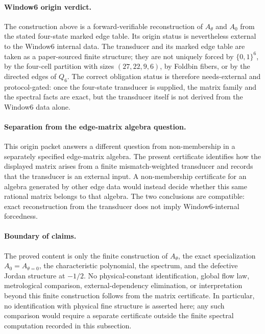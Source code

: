 \paragraph{Window6 origin verdict.}
The construction above is a forward-verifiable reconstruction of $A_\theta$ and $A_0$ from the stated four-state marked edge table.  Its origin status is nevertheless external to the Window6 internal data.  The transducer and its marked edge table are taken as a paper-sourced finite structure; they are not uniquely forced by $\{0,1\}^6$, by the four-cell partition with sizes $(27,22,9,6)$, by Foldbin fibers, or by the directed edges of $Q_6$.  The correct obligation status is therefore needs-external and protocol-gated: once the four-state transducer is supplied, the matrix family and the spectral facts are exact, but the transducer itself is not derived from the Window6 data alone.

\paragraph{Separation from the edge-matrix algebra question.}
This origin packet answers a different question from non-membership in a separately specified edge-matrix algebra.  The present certificate identifies how the displayed matrix arises from a finite mismatch-weighted transducer and records that the transducer is an external input.  A non-membership certificate for an algebra generated by other edge data would instead decide whether this same rational matrix belongs to that algebra.  The two conclusions are compatible: exact reconstruction from the transducer does not imply Window6-internal forcedness.

\paragraph{Boundary of claims.}
The proved content is only the finite construction of $A_\theta$, the exact specialization $A_0=A_{\theta=0}$, the characteristic polynomial, the spectrum, and the defective Jordan structure at $-1/2$.  No physical-constant identification, global flow law, metrological comparison, external-dependency elimination, or interpretation beyond this finite construction follows from the matrix certificate.  In particular, no identification with physical fine structure is asserted here; any such comparison would require a separate certificate outside the finite spectral computation recorded in this subsection.
